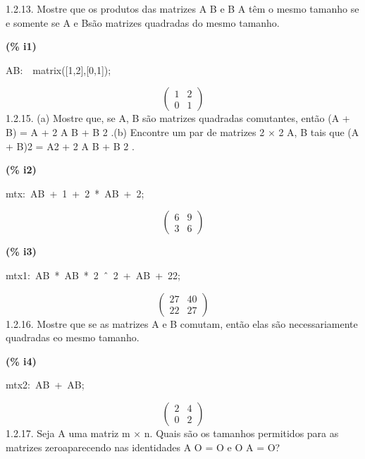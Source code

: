 \documentclass[fleqn]{article}
\begin{document}
1.2.13. Mostre que os produtos das matrizes A B e B A têm o mesmo tamanho se e somente se A e Bsão matrizes quadradas do mesmo tamanho.


\noindent
\begin{minipage}[t]{4.000000em}\color{red}\bfseries
(\% i1)	
\end{minipage}
\begin{minipage}[t]{\textwidth}\color{blue}
AB:\ \ matrix([1,2],[0,1]);
\end{minipage}
\[\displaystyle \tag{AB} 
\begin{pmatrix}1 & 2\\
0 & 1\end{pmatrix}\mbox{}
\]
1.2.15. (a) Mostre que, se A, B são matrizes quadradas comutantes, então (A + B) = A + 2 A B + B 2 .(b) Encontre um par de matrizes 2 × 2 A, B tais que (A + B)2 = A2 + 2 A B + B 2 .


\noindent
\begin{minipage}[t]{4.000000em}\color{red}\bfseries
(\% i2)	
\end{minipage}
\begin{minipage}[t]{\textwidth}\color{blue}
mtx:\ AB\ +\ 1\ +\ 2\ *\ AB\ +\ 2;
\end{minipage}
\[\displaystyle \tag{mtx} 
\begin{pmatrix}6 & 9\\
3 & 6\end{pmatrix}\mbox{}
\]


\noindent
\begin{minipage}[t]{4.000000em}\color{red}\bfseries
(\% i3)	
\end{minipage}
\begin{minipage}[t]{\textwidth}\color{blue}
mtx1:\ AB\ *\ AB\ *\ 2\ \^\ \ 2\ +\ AB\ +\ 22;
\end{minipage}
\[\displaystyle \tag{mtx1} 
\begin{pmatrix}27 & 40\\
22 & 27\end{pmatrix}\mbox{}
\]
1.2.16. Mostre que se as matrizes A e B comutam, então elas são necessariamente quadradas eo mesmo tamanho.


\noindent
\begin{minipage}[t]{4.000000em}\color{red}\bfseries
(\% i4)	
\end{minipage}
\begin{minipage}[t]{\textwidth}\color{blue}
mtx2:\ AB\ +\ AB;
\end{minipage}
\[\displaystyle \tag{mtx2} 
\begin{pmatrix}2 & 4\\
0 & 2\end{pmatrix}\mbox{}
\]
1.2.17. Seja A uma matriz m × n. Quais são os tamanhos permitidos para as matrizes zeroaparecendo nas identidades A O = O e O A = O?
\end{document}
